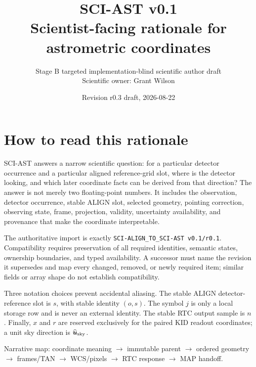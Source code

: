 \documentclass[10pt]{article}
\title{\vspace{-1.5em}\textcolor{astnavy}{\textbf{SCI-AST v0.1}}\\
\large Scientist-facing rationale for astrometric coordinates}
\author{Stage B targeted implementation-blind scientific author draft\\
Scientific owner: Grant Wilson}
\date{Revision r0.3 draft, 2026-08-22}
\begin{document}
\maketitle
\thispagestyle{empty}
\begin{center}
\end{center}

\section*{How to read this rationale}
SCI-AST answers a narrow scientific question: for a particular detector
occurrence and a particular aligned reference-grid slot, where is the detector
looking, and which later coordinate facts can be derived from that direction?
The answer is not merely two floating-point numbers. It includes the
observation, detector occurrence, stable ALIGN slot, selected geometry,
pointing correction, observing state, frame, projection, validity, uncertainty
availability, and provenance that make the coordinate interpretable.

The authoritative import is exactly
\nolinkurl{SCI-ALIGN_TO_SCI-AST v0.1/r0.1}. Compatibility requires preservation
of all required identities, semantic states, ownership boundaries, and typed
availability. A successor must name the revision it supersedes and map every
changed, removed, or newly required item; similar fields or array shape do not
establish compatibility.

Three notation choices prevent accidental aliasing. The stable ALIGN
detector-reference slot is $s$, with stable identity $(o,s)$. The symbol $j$
is only a local storage row and is never an external identity. The stable RTC
output sample is $n$. Finally, $x$ and $r$ are reserved exclusively for the
paired KID readout coordinates; a unit sky direction is
$\widehat{\boldsymbol u}_{\rm sky}$.
\vfill
\begin{center}\small
Narrative map: coordinate meaning $\rightarrow$ immutable parent $\rightarrow$
ordered geometry $\rightarrow$ frames/TAN $\rightarrow$ WCS/pixels
$\rightarrow$ RTC response $\rightarrow$ MAP handoff.
\end{center}
\end{document}

